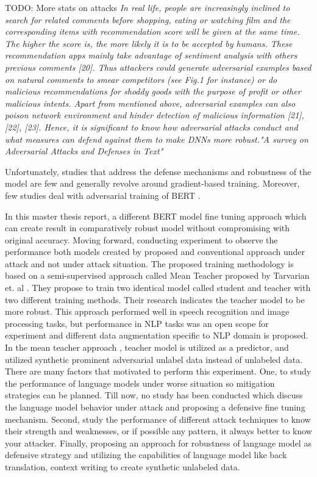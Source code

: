 \documentclass[%
	BCOR=8mm, %
	DIV=12, 
	toc=bibliography, %
	toc=listof, %
	oneside, %
	egregdoesnotlikesansseriftitles, %
	]{scrbook}
\begin{document}
TODO: More stats on attacks 
\textit{In real life, people are increasingly inclined to search for related comments before shopping, eating or watching film and the corresponding items with recommendation score will be 
given at the same time. The higher the score is, the more likely it is to be accepted by humans. These recommendation apps mainly take advantage of sentiment analysis with others previous
 comments [20]. Thus attackers could generate adversarial examples based on natural comments to smear competitors (see Fig.1 for instance) or do malicious recommendations for shoddy 
 goods with the purpose of profit or other malicious intents. Apart from mentioned above, adversarial examples can also poison network environment and hinder detection of malicious 
 information [21], [22], [23]. Hence, it is significant to know how adversarial attacks conduct and what measures can defend against them to make DNNs more robust."A survey on Adversarial 
 Attacks and Defenses in Text"}

Unfortunately, studies that address the defense mechanisms and robustness of the model are few and generally revolve around gradient-based training. Moreover, few studies deal with adversarial 
training of BERT \cite{zhu_at-bert_2021,du_adversarial_2020}. 

In this master thesis report, a different BERT model fine tuning approach which can create result in comparatively robust model without compromising with original accuracy. Moving forward, 
conducting experiment to observe the performance both models created by proposed and conventional approach  under attack and not under attack situation. The proposed training methodology 
is based on a semi-supervised approach called Mean Teacher proposed by Tarvarian et$.$ al \cite{tarvainen_mean_2018}. They propose to train two identical model called student and teacher  
with two different training methods. Their research indicates the teacher model to be more robust. This approach performed well in speech recognition and image processing tasks, but performance 
in NLP tasks was an open scope for experiment and different data augmentation specific to NLP domain is proposed. In the mean teacher approach , teacher model is utilized as a predictor, and
 utilized synthetic prominent adversarial unlabel data instead of unlabeled data.\\
 
There are many factors that motivated to perform this experiment. One, to study the performance of language models under worse situation so mitigation strategies can be planned. Till now, no  
study has been conducted which discuss the language model behavior under attack and proposing a defensive fine tuning mechanism.  Second, study the performance of different attack techniques 
to know their strength and weaknesses, or if possible any pattern, it always better to know your attacker. Finally, proposing an approach for robustness of language model as defensive strategy and utilizing the capabilities of language model like back translation, context writing to create synthetic unlabeled data.
\end{document}
